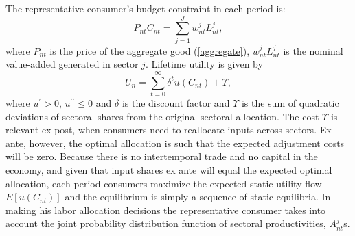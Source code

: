 \documentclass{article}
\begin{document}
The representative consumer's budget constraint in each period is: 
\[
P_{nt}C_{nt}=\sum_{j=1}^{J}w_{nt}^{j}L_{nt}^{j},
\]%
where $P_{nt}$ is the price of the aggregate good (\ref{aggregate}), $%
w_{nt}^{j}L_{nt}^{j}$ is the nominal value-added generated in sector $j$.
Lifetime utility is given by 
\[
U_{n}=\sum\limits_{t=0}^{\infty }\delta ^{t}u(C_{nt})+\Upsilon ,
\]%
where $u^{\prime }>0$, $u^{\prime \prime }\leq 0$ and $\delta $ is the
discount factor and $\Upsilon $ is the sum of quadratic deviations of
sectoral shares from the original sectoral allocation. The cost $\Upsilon $
is relevant ex-post, when consumers need to reallocate inputs across
sectors. Ex ante, however, the optimal allocation is such  that the expected
adjustment costs will be zero. Because there is no intertemporal trade and
no capital in the economy, and given that input shares ex ante will equal
the expected optimal allocation, each period consumers maximize the expected
static utility flow $E\left[ u\left( C_{nt}\right) \right] $ and the
equilibrium is simply a sequence of static equilibria. In making his labor
allocation decisions the representative consumer takes into account the
joint probability distribution function of sectoral productivities, $%
A_{nt}^{j}$s.
\end{document}
